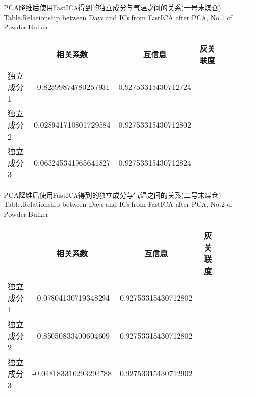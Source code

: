 \begin{table}[!htb]
\begin{center}
			{PCA降维后使用FastICA得到的独立成分与气温之间的关系(一号末煤仓)}
			{Table.}{Relationship between Days and ICs from FastICA after PCA, No.1 of Powder Bulker}
\begin{tabular}{lccclccc}
\toprule
                & 相关系数     				& 互信息      			&灰关联度 \\
\midrule
  独立成分1     &  -0.82599874780257931		& 0.92753315430712724   &     \\
  独立成分2     &  0.028941710801729584		& 0.92753315430712802   &     \\
  独立成分3     &  0.063245341965641827		& 0.92753315430712824   &      \\
 \bottomrule
\end{tabular}
\end{center}
\end{table}

\begin{table}[!htb]
\begin{center}
			{PCA降维后使用FastICA得到的独立成分与气温之间的关系(二号末煤仓)}
			{Table.}{Relationship between Days and ICs from FastICA after PCA, No.2 of Powder Bulker}
\begin{tabular}{lccclccc}
\toprule
                & 相关系数     				& 互信息      			&灰关联度 \\
\midrule
  独立成分1     &  -0.07804130719348294		& 0.92753315430712802	&    \\
  独立成分2     &  -0.85050833400604609		& 0.92753315430712802	&    \\
  独立成分3     &  -0.048183316293294788		& 0.92753315430712902	&    \\
 \bottomrule
\end{tabular}
\end{center}
\end{table}


